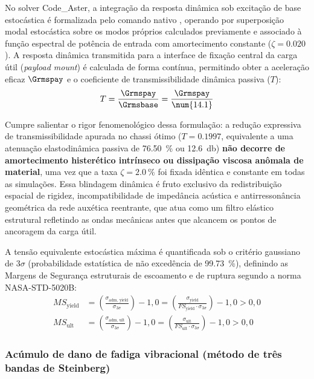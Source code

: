 No solver Code\_Aster, a integração da resposta dinâmica sob excitação de base estocástica é formalizada pelo comando nativo , operando por superposição modal estocástica sobre os modos próprios calculados previamente e associado à função espectral de potência de entrada com amortecimento constante ($\zeta = \num{0.020}$). A resposta dinâmica transmitida para a interface de fixação central da carga útil (\textit{payload mount}) é calculada de forma contínua, permitindo obter a aceleração eficaz $\Grmspay$ e o coeficiente de transmissibilidade dinâmica passiva ($T$):
\begin{equation}
  T = \frac{\Grmspay}{\Grmsbase} = \frac{\Grmspay}{\num{14.1}}
  \label{eq:transmissibilidade}
\end{equation}

Cumpre salientar o rigor fenomenológico dessa formulação: a redução expressiva de transmissibilidade apurada no chassi ótimo ($T = \num{0.1997}$, equivalente a uma atenuação elastodinâmica passiva de \SI{76.50}{\percent} ou \SI{12.6}{\decibel}) \textbf{não decorre de amortecimento histerético intrínseco ou dissipação viscosa anômala de material}, uma vez que a taxa $\zeta = \SI{2.0}{\percent}$ foi fixada idêntica e constante em todas as simulações. Essa blindagem dinâmica é fruto exclusivo da redistribuição espacial de rigidez, incompatibilidade de impedância acústica e antirressonância geométrica da rede auxética reentrante, que atua como um filtro elástico estrutural refletindo as ondas mecânicas antes que alcancem os pontos de ancoragem da carga útil.

A tensão equivalente estocástica máxima é quantificada sob o critério gaussiano de $3\sigma$ (probabilidade estatística de não excedência de \SI{99.73}{\percent}), definindo as Margens de Segurança estruturais de escoamento e de ruptura segundo a norma NASA-STD-5020B:
\begin{align}
  MS_{\text{yield}} &= \left( \frac{\sigma_{\text{adm, yield}}}{\sigma_{3\sigma}} \right) - 1{,}0 = \left( \frac{\sigma_{\text{yield}}}{FS_{\text{yield}} \cdot \sigma_{3\sigma}} \right) - 1{,}0 > 0{,}0 \label{eq:ms-yield} \\
  MS_{\text{ult}} &= \left( \frac{\sigma_{\text{adm, ult}}}{\sigma_{3\sigma}} \right) - 1{,}0 = \left( \frac{\sigma_{\text{ult}}}{FS_{\text{ult}} \cdot \sigma_{3\sigma}} \right) - 1{,}0 > 0{,}0 \label{eq:ms-ult}
\end{align}

\subsubsection{Acúmulo de dano de fadiga vibracional (método de três bandas de Steinberg)}
\label{subsubsec:steinberg}

